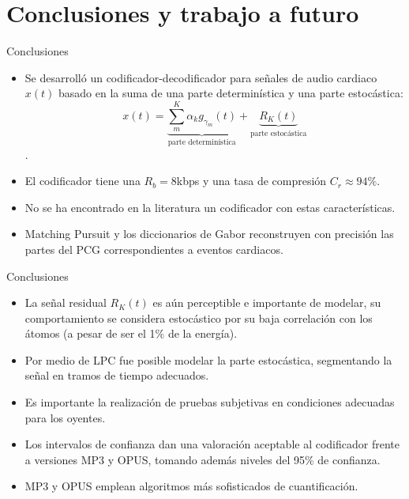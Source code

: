 \documentclass[xcolor=table]{beamer}
\begin{document}
\section{Conclusiones y trabajo a futuro}
\begin{frame}{Conclusiones}
	\begin{itemize}
		\item<2-> Se desarroll\'o un codificador-decodificador para se\~nales de audio cardiaco $x(t)$ basado en la suma de una parte determin\'istica y una parte estoc\'astica:
		\[
 x(t) = \underbrace{\sum_{m}^K \alpha_{k}g_{\gamma_{m}}(t)}_{\text{parte determin\'istica}} + \underbrace{R_{K}(t)}_{\text{parte estoc\'astica}}
\].
	\item<3-> El codificador tiene una $R_{b}=8 $kbps y una tasa de compresi\'on $C_{r}\approx 94\%.$
	\item<4-> No se ha encontrado en la literatura un codificador con estas caracter\'isticas.
	\item<5-> Matching Pursuit y los diccionarios de Gabor reconstruyen con precisi\'on las partes del PCG correspondientes a eventos cardiacos.
	\end{itemize}
\end{frame}
\begin{frame}{Conclusiones}	
	\begin{itemize}
	\item<2-> La se\~nal residual $R_{K}(t)$ es a\'un perceptible e importante de modelar, su comportamiento se considera estoc\'astico por su baja correlaci\'on con los \'atomos (a pesar de ser el 1\% de la energ\'ia).
	\item<3-> Por medio de LPC fue posible modelar la parte estoc\'astica, segmentando la se\~nal en tramos de tiempo adecuados.
	\item<4-> Es importante la realizaci\'on de pruebas subjetivas en condiciones adecuadas para los oyentes.
	\item<5-> Los intervalos de confianza dan una valoraci\'on aceptable al codificador frente a versiones MP3 y OPUS, tomando adem\'as niveles del 95\% de confianza.
	\item<6-> MP3 y OPUS emplean algoritmos m\'as sofisticados de cuantificaci\'on.
	\end{itemize}
\end{frame}
\end{document}
